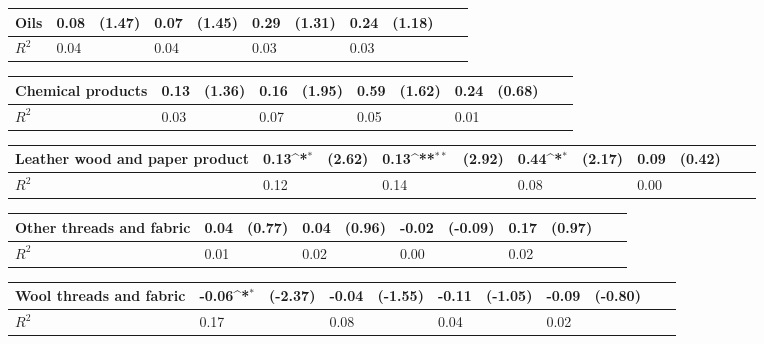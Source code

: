 \def\sym#1{\ifmmode^{#1}\else\(^{#1}\)\fi}
\begin{tabular}{p{4cm} p{1.4cm} p{1.2cm} p{1.5cm}  p{1.5cm} p{1.4cm} p{1.2cm} p{1.5cm} p{1.5cm}  p{1.5cm} p{1.5cm} }
\hline
Oils            &     0.08         &   (1.47)&     0.07         &   (1.45)&     0.29         &   (1.31)&     0.24         &   (1.18)\\
\hline
\(R^{2}\)       &     0.04         &         &     0.04         &         &     0.03         &         &     0.03         &         \\
\end{tabular}
\def\sym#1{\ifmmode^{#1}\else\(^{#1}\)\fi}
\begin{tabular}{p{4cm} p{1.4cm} p{1.2cm} p{1.5cm}  p{1.5cm} p{1.4cm} p{1.2cm} p{1.5cm} p{1.5cm}  p{1.5cm} p{1.5cm} }
\hline
Chemical products&     0.13         &   (1.36)&     0.16         &   (1.95)&     0.59         &   (1.62)&     0.24         &   (0.68)\\
\hline
\(R^{2}\)       &     0.03         &         &     0.07         &         &     0.05         &         &     0.01         &         \\
\end{tabular}
\def\sym#1{\ifmmode^{#1}\else\(^{#1}\)\fi}
\begin{tabular}{p{4cm} p{1.4cm} p{1.2cm} p{1.5cm}  p{1.5cm} p{1.4cm} p{1.2cm} p{1.5cm} p{1.5cm}  p{1.5cm} p{1.5cm} }
\hline
Leather wood and paper product&     0.13\sym{*}  &   (2.62)&     0.13\sym{**} &   (2.92)&     0.44\sym{*}  &   (2.17)&     0.09         &   (0.42)\\
\hline
\(R^{2}\)       &     0.12         &         &     0.14         &         &     0.08         &         &     0.00         &         \\
\end{tabular}
\def\sym#1{\ifmmode^{#1}\else\(^{#1}\)\fi}
\begin{tabular}{p{4cm} p{1.4cm} p{1.2cm} p{1.5cm}  p{1.5cm} p{1.4cm} p{1.2cm} p{1.5cm} p{1.5cm}  p{1.5cm} p{1.5cm} }
\hline
Other threads and fabric&     0.04         &   (0.77)&     0.04         &   (0.96)&    -0.02         &  (-0.09)&     0.17         &   (0.97)\\
\hline
\(R^{2}\)       &     0.01         &         &     0.02         &         &     0.00         &         &     0.02         &         \\
\end{tabular}
\def\sym#1{\ifmmode^{#1}\else\(^{#1}\)\fi}
\begin{tabular}{p{4cm} p{1.4cm} p{1.2cm} p{1.5cm}  p{1.5cm} p{1.4cm} p{1.2cm} p{1.5cm} p{1.5cm}  p{1.5cm} p{1.5cm} }
\hline
Wool threads and fabric&    -0.06\sym{*}  &  (-2.37)&    -0.04         &  (-1.55)&    -0.11         &  (-1.05)&    -0.09         &  (-0.80)\\
\hline
\(R^{2}\)       &     0.17         &         &     0.08         &         &     0.04         &         &     0.02         &         \\
\end{tabular}
